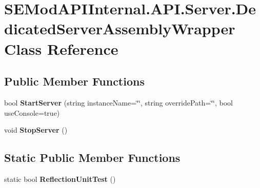 \hypertarget{class_s_e_mod_a_p_i_internal_1_1_a_p_i_1_1_server_1_1_dedicated_server_assembly_wrapper}{}\section{S\+E\+Mod\+A\+P\+I\+Internal.\+A\+P\+I.\+Server.\+Dedicated\+Server\+Assembly\+Wrapper Class Reference}
\label{class_s_e_mod_a_p_i_internal_1_1_a_p_i_1_1_server_1_1_dedicated_server_assembly_wrapper}
\subsection*{Public Member Functions}
\begin{DoxyCompactItemize}
\item 
\hypertarget{class_s_e_mod_a_p_i_internal_1_1_a_p_i_1_1_server_1_1_dedicated_server_assembly_wrapper_a1609f3eeb0d8ae528df4437132737c71}{}bool {\bfseries Start\+Server} (string instance\+Name=\char`\"{}\char`\"{}, string override\+Path=\char`\"{}\char`\"{}, bool use\+Console=true)\label{class_s_e_mod_a_p_i_internal_1_1_a_p_i_1_1_server_1_1_dedicated_server_assembly_wrapper_a1609f3eeb0d8ae528df4437132737c71}

\item 
\hypertarget{class_s_e_mod_a_p_i_internal_1_1_a_p_i_1_1_server_1_1_dedicated_server_assembly_wrapper_ae67ff0317a06c59f3e186671efab1df4}{}void {\bfseries Stop\+Server} ()\label{class_s_e_mod_a_p_i_internal_1_1_a_p_i_1_1_server_1_1_dedicated_server_assembly_wrapper_ae67ff0317a06c59f3e186671efab1df4}

\end{DoxyCompactItemize}
\subsection*{Static Public Member Functions}
\begin{DoxyCompactItemize}
\item 
\hypertarget{class_s_e_mod_a_p_i_internal_1_1_a_p_i_1_1_server_1_1_dedicated_server_assembly_wrapper_a93592ef2c9c8f9181720c77e05e9d2e5}{}static bool {\bfseries Reflection\+Unit\+Test} ()\label{class_s_e_mod_a_p_i_internal_1_1_a_p_i_1_1_server_1_1_dedicated_server_assembly_wrapper_a93592ef2c9c8f9181720c77e05e9d2e5}

\end{DoxyCompactItemize}
